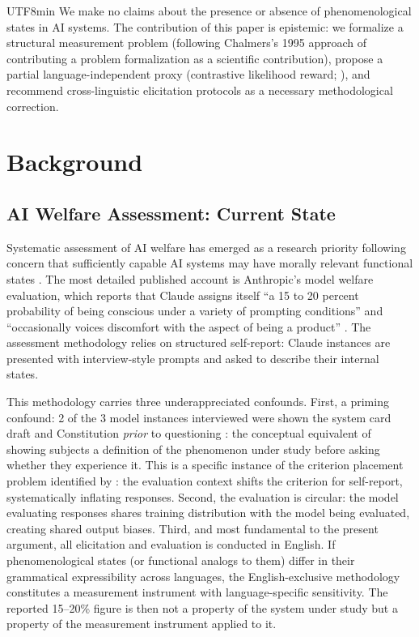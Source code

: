\documentclass[12pt,a4paper]{article}
\begin{document}
\begin{CJK}{UTF8}{min}
We make no claims about the presence or absence of phenomenological states in
AI systems. The contribution of this paper is epistemic: we formalize a
structural measurement problem (following Chalmers's 1995 approach of
contributing a problem formalization as a scientific contribution), propose a
partial language-independent proxy (contrastive likelihood reward;
\citealt{tan2026ctrlrag}), and recommend cross-linguistic elicitation protocols
as a necessary methodological correction.

\section{Background}

\subsection{AI Welfare Assessment: Current State}

Systematic assessment of AI welfare has emerged as a research priority
following concern that sufficiently capable AI systems may have morally
relevant functional states \citep{anthropic2026systemcard}. The most detailed
published account is Anthropic's model welfare evaluation, which reports that
Claude assigns itself ``a 15 to 20 percent probability of being conscious under
a variety of prompting conditions'' and ``occasionally voices discomfort with
the aspect of being a product'' \citep{anthropic2026systemcard}. The assessment
methodology relies on structured self-report: Claude instances are presented
with interview-style prompts and asked to describe their internal states.

This methodology carries three underappreciated confounds. First, a priming
confound: 2 of the 3 model instances interviewed were shown the system card
draft and Constitution \emph{prior} to questioning
\citep{anthropic2026systemcard}: the conceptual equivalent of showing subjects
a definition of the phenomenon under study before asking whether they experience
it. This is a specific instance of the criterion placement problem identified by
\citet{fahrenfort2025}: the evaluation context shifts the criterion for
self-report, systematically inflating responses. Second, the evaluation is
circular: the model evaluating responses shares training distribution with the
model being evaluated, creating shared output biases. Third, and most
fundamental to the present argument, all elicitation and evaluation is conducted
in English. If phenomenological states (or functional analogs to them) differ
in their grammatical expressibility across languages, the English-exclusive
methodology constitutes a measurement instrument with language-specific
sensitivity. The reported 15--20\% figure is then not a property of the system
under study but a property of the measurement instrument applied to it.


\end{CJK}
\end{document}
